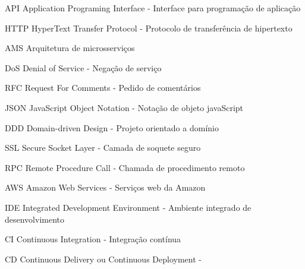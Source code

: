 
\begin{siglas}
	\item[API]{Application Programing Interface - Interface para programação de aplicação}
	\item[HTTP]{HyperText Transfer Protocol - Protocolo de transferência de hipertexto}
	\item[AMS]{Arquitetura de microsserviços}
	\item[DoS]{Denial of Service - Negação de serviço}
	\item[RFC]{Request For Comments - Pedido de comentários}
	\item[JSON]{JavaScript Object Notation - Notação de objeto javaScript}
	\item[DDD]{Domain-driven Design - Projeto orientado a domínio}
	\item[SSL]{Secure Socket Layer - Camada de soquete seguro}
	\item[RPC]{Remote Procedure Call - Chamada de procedimento remoto} 
	\item[AWS]{Amazon Web Services - Serviços web da Amazon} 
	\item[IDE]{Integrated Development Environment - Ambiente integrado de desenvolvimento} 
	\item[CI]{Continuous Integration - Integração contínua}
	\item[CD]{Continuous Delivery ou Continuous Deployment - }
\end{siglas}